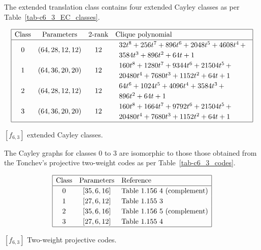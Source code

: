 \documentclass[12pt,a4paper]{article}
\begin{document}
The extended translation class contains four extended Cayley classes as per Table~\ref{tab-c6_3_EC_classes}.

\begin{table}[!bhpt] %
%
\small{}
\begin{align*}
\def\arraystretch{1.2}
\begin{array}{|cccl|}
\hline
\text{Class} &
\text{Parameters} &
\text{2-rank} &
\text{Clique polynomial}
\\
\hline
0 &
(64, 28, 12, 12) &
12 &
\begin{array}{l}
32t^{8} + 256t^{7} + 896t^{6} + 2048t^{5} + 4608t^{4}
\,+
\\
 3584t^{3} + 896t^{2} + 64t + 1
\end{array}
\\
1 &
(64, 36, 20, 20) &
12 &
\begin{array}{l}
160t^{8} + 1280t^{7} + 9344t^{6} + 21504t^{5}
\,+
\\
 20480t^{4} + 7680t^{3} + 1152t^{2} + 64t + 1
\end{array}
\\
2 &
(64, 28, 12, 12) &
12 &
\begin{array}{l}
64t^{6} + 1024t^{5} + 4096t^{4} + 3584t^{3}
\,+
\\
 896t^{2} + 64t + 1
\end{array}
\\
3 &
(64, 36, 20, 20) &
12 &
\begin{array}{l}
160t^{8} + 1664t^{7} + 9792t^{6} + 21504t^{5}
\,+
\\
 20480t^{4} + 7680t^{3} + 1152t^{2} + 64t + 1
\end{array}
\\
\hline
\end{array}
\end{align*}
%
\caption{$[f_{6,3}]$ extended Cayley classes.}
\label{tab-c6_3_EC_classes}
\end{table}

The Cayley graphs for classes 0 to 3 are isomorphic to those those obtained from the
Tonchev's projective two-weight codes \cite{Ton07codes} as per Table~\ref{tab-c6_3_codes}.

\begin{table}[!bhpt] %
\small{
\begin{align*}
\def\arraystretch{1.2}
\begin{array}{|ccl|}
\hline
\text{Class} &
\text{Parameters} & \text{Reference}
\\
\hline
0 & [35,6,16] & \text{Table 1.156 4 (complement)}
\\
1 & [27,6,12] & \text{Table 1.155 3 }
\\
2 & [35,6,16] & \text{Table 1.156 5 (complement)}
\\
3 & [27,6,12] & \text{Table 1.155 4 }
\\
\hline
\end{array}
\end{align*}
}
\caption{$[f_{6,3}]$ Two-weight projective codes.}
\label{tab-c6_3_codes}
\end{table}
\end{document}
